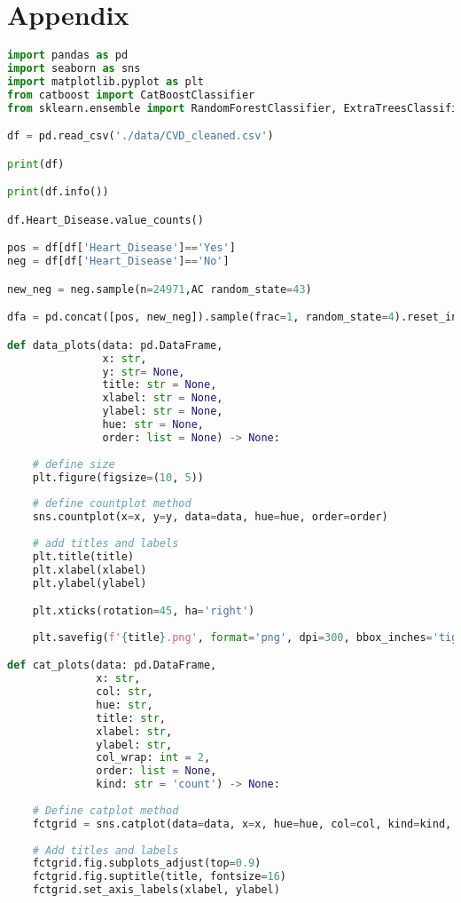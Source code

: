\documentclass[12pt, a4paper,twoside]{report}
\numberwithin{equation}{chapter}
\begin{document}
\chapter{Appendix}
\begin{lstlisting}[language=Python]
import pandas as pd
import seaborn as sns
import matplotlib.pyplot as plt
from catboost import CatBoostClassifier
from sklearn.ensemble import RandomForestClassifier, ExtraTreesClassifier, AdaBoostClassifier

df = pd.read_csv('./data/CVD_cleaned.csv')

print(df)

print(df.info())

df.Heart_Disease.value_counts()

pos = df[df['Heart_Disease']=='Yes']
neg = df[df['Heart_Disease']=='No']

new_neg = neg.sample(n=24971,AC random_state=43)

dfa = pd.concat([pos, new_neg]).sample(frac=1, random_state=4).reset_index(drop=True)

def data_plots(data: pd.DataFrame, 
               x: str,
               y: str= None,
               title: str = None,
               xlabel: str = None,
               ylabel: str = None,
               hue: str = None,
               order: list = None) -> None:
    
    # define size
    plt.figure(figsize=(10, 5))
    
    # define countplot method
    sns.countplot(x=x, y=y, data=data, hue=hue, order=order)
    
    # add titles and labels
    plt.title(title)
    plt.xlabel(xlabel)
    plt.ylabel(ylabel)

    plt.xticks(rotation=45, ha='right')
    
    plt.savefig(f'{title}.png', format='png', dpi=300, bbox_inches='tight')

def cat_plots(data: pd.DataFrame, 
              x: str, 
              col: str, 
              hue: str,
              title: str,
              xlabel: str,
              ylabel: str,
              col_wrap: int = 2, 
              order: list = None,
              kind: str = 'count') -> None:
    
    # Define catplot method
    fctgrid = sns.catplot(data=data, x=x, hue=hue, col=col, kind=kind, height=6, aspect=1.2, col_wrap=col_wrap, order=order)
    
    # Add titles and labels
    fctgrid.fig.subplots_adjust(top=0.9)
    fctgrid.fig.suptitle(title, fontsize=16)
    fctgrid.set_axis_labels(xlabel, ylabel)
    

\end{lstlisting}
\end{document}

